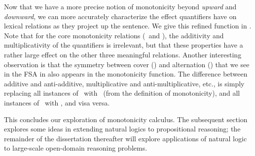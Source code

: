 Now that we have a more precise notion of monotonicity beyond \textit{upward} 
  and \textit{downward}, we can more accurately characterize the effect quantifiers have on
  lexical relations as they project up the sentence.
We give this refined function in .
Note that for the core monotonicity relations (\forward\ and \reverse), the additivity and
  multiplicativity of the quantifiers is irrelevant, but that these properties have a rather
  large effect on the other three meaningful relations.
Another interesting observation is that the symmetry between 
  cover (\cover) and alternation (\alternate) that we see in the FSA in 
  also appears in the monotonicity function.
The difference between additive and anti-additive, multiplicative and anti-multiplicative, etc.,
  is simply replacing all instances of \forward\ with \reverse\ (from the definition of
  monotonicity), and all instances of \cover\ with \alternate, and visa versa.

This concludes our exploration of monotonicity calculus.
The subsequent section explores some ideas in extending natural logics to propositional 
  reasoning; the remainder of the dissertation thereafter will explore applications of natural logic
  to large-scale open-domain reasoning problems.




